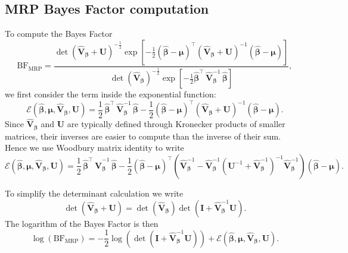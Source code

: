 \documentclass{nature}
\def\bs{\boldsymbol}
\begin{document}
\subsection{MRP Bayes Factor computation} \label{app1}
To compute the Bayes Factor 
$$\textrm{BF}_{\textrm{MRP}} = \frac{\det\left(\widehat{\mathbf{\textrm{V}}}_{{\bs {\beta}}} + \mathbf{U} \right)^{-\frac{1}{2}}
\exp\left[-\frac{1}{2}\left({\bs {\widehat{\beta}} - {\bs \mu}}\right)^{\intercal}\left(\widehat{\mathbf{\textrm{V}}}_{{\bs {\beta}}} + \mathbf{U}\right)^{-1}\left({\bs {\widehat{\beta}}} - {\bs \mu}\right)\right]}
{\det \left( \widehat{\mathbf{\textrm{V}}}_{\bs {\beta}}\right)^{-\frac{1}{2}}\exp \left[-\frac{1}{2}{\bs {\widehat{\beta}}}^{\intercal}\, \widehat{\mathbf{\textrm{V}}}_{\bs {\beta}}^{-1} 
\,{\bs {\widehat{\beta}}}\right]},$$
we first consider the term inside the exponential function:
$$ \mathcal{E} \left(\widehat{\bs \beta}, \bs \mu, \widehat{\mathbf{\textrm{V}}}_{\bs {\beta}}, \mathbf{U}\right) = 
\frac{1}{2}\, {\bs {\widehat{\beta}}}^{\intercal}\, \widehat{\mathbf{\textrm{V}}}_{\bs {\beta}}^{-1} \,{\bs {\widehat{\beta}}}
-\frac{1}{2}\left({\bs {\widehat{\beta}} - {\bs \mu}}\right)^{\intercal}\left(\widehat{\mathbf{\textrm{V}}}_{{\bs {\beta}}} + \mathbf{U}\right)^{-1}\left({\bs {\widehat{\beta}}} - {\bs \mu}\right).
$$
Since $\widehat{\mathbf{\textrm{V}}}_{\bs {\beta}}$ and $\mathbf{U}$ are typically defined through Kronecker products of smaller matrices, their inverses
are easier to compute than the inverse of their sum. Hence we use Woodbury matrix identity to write
$$ 
\mathcal{E} \left(\widehat{\bs \beta}, \bs \mu, \widehat{\mathbf{\textrm{V}}}_{\bs {\beta}}, \mathbf{U}\right) = 
\frac{1}{2}\, {\bs {\widehat{\beta}}}^{\intercal}\, \widehat{\mathbf{\textrm{V}}}_{\bs {\beta}}^{-1} \,{\bs {\widehat{\beta}}}
-\frac{1}{2}\left({\bs {\widehat{\beta}} - {\bs \mu}}\right)^{\intercal} \left( \widehat{\mathbf{\textrm{V}}}_{\bs {\beta}}^{-1} - \widehat{\mathbf{\textrm{V}}}_{\bs {\beta}}^{-1} 
\left(\mathbf{U}^{-1} + \widehat{\mathbf{\textrm{V}}}_{\bs {\beta}}^{-1} \right)^{-1} \widehat{\mathbf{\textrm{V}}}_{\bs {\beta}}^{-1} \right ) 
\left({\bs {\widehat{\beta}} - {\bs \mu}}\right).
$$

To simplify the determinant calculation we write 
$$\det\left( \widehat{\mathbf{\textrm{V}}}_{{\bs {\beta}}} + \mathbf{U} \right) = \det\left( \widehat{\mathbf{\textrm{V}}}_{{\bs {\beta}}}\right) \det\left( \mathbf{I} + \widehat{\mathbf{\textrm{V}}}_{{\bs {\beta}}}^{-1} \mathbf{U}\right).$$
The logarithm of the Bayes Factor is then
$$\log \left( \textrm{BF}_{\textrm{MRP}} \right) = 
-\frac{1}{2} \log \left( \det\left( \mathbf{I} + \widehat{\mathbf{\textrm{V}}}_{{\bs {\beta}}}^{-1} \mathbf{U} \right) \right)  + \mathcal{E} \left(\widehat{\bs \beta}, \bs \mu, \widehat{\mathbf{\textrm{V}}}_{\bs {\beta}}, \mathbf{U}\right).$$
\end{document}
